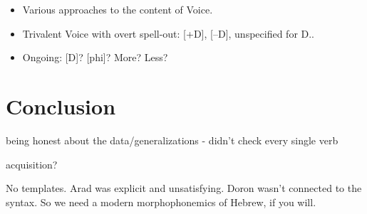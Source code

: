\begin{itemize}
	\item Various approaches to the content of Voice.
	\item Trivalent Voice with overt spell-out: [+D], [--D], unspecified for D..
	\item Ongoing: [D]? [phi]? More? Less?
\end{itemize}


\section{Conclusion} \label{i:conc}

being honest about the data/generalizations - didn't check every single verb

acquisition?


No templates. Arad was explicit and unsatisfying. Doron wasn't connected to the syntax. So we need a modern morphophonemics of Hebrew, if you will.



